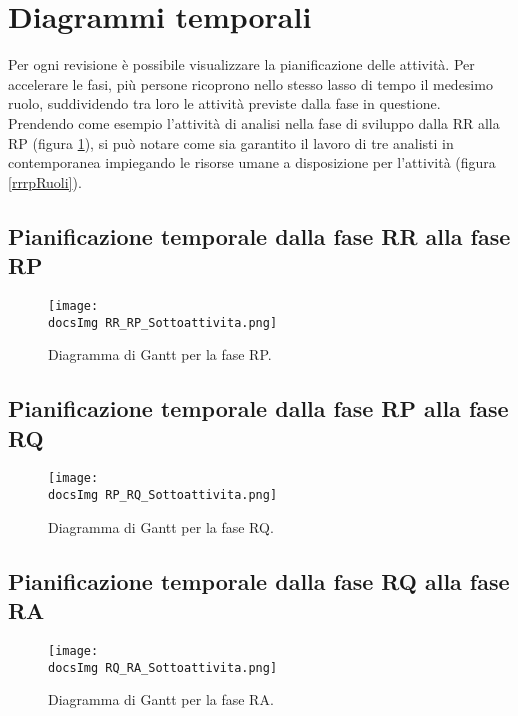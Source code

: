 \section{Diagrammi temporali}{
	Per ogni revisione è possibile visualizzare la pianificazione delle attività.
Per accelerare le fasi, più persone ricoprono nello stesso lasso di tempo il medesimo ruolo, suddividendo tra loro le attività previste dalla fase in questione.\\
Prendendo come esempio l'attività di analisi nella fase di sviluppo dalla RR alla RP (figura \ref{pp}), si può notare come sia garantito il lavoro di tre analisti in contemporanea impiegando le risorse umane a disposizione per l'attività (figura \ref{rrrpRuoli}).

	\subsection{Pianificazione temporale dalla fase RR alla fase RP}{
	\begin{figure}[h!]
		\centering
		\texttt{[image: \\docsImg RR\_RP\_Sottoattivita.png]}
		\caption{Diagramma di Gantt per la fase RP.}
		\label{pp}
	\end{figure}
	}
\newpage
	\subsection{Pianificazione temporale dalla fase RP alla fase RQ}{
	\begin{figure}[h!]
		\centering
		\texttt{[image: \\docsImg RP\_RQ\_Sottoattivita.png]}
		\caption{Diagramma di Gantt per la fase RQ.}
		
	\end{figure} 
	
	}
\newpage	
	\subsection{Pianificazione temporale dalla fase RQ alla fase RA }{
	\begin{figure}[h!]
		\centering
		\texttt{[image: \\docsImg RQ\_RA\_Sottoattivita.png]}
		\caption{Diagramma di Gantt per la fase RA.}
	\end{figure} 
	}

}
